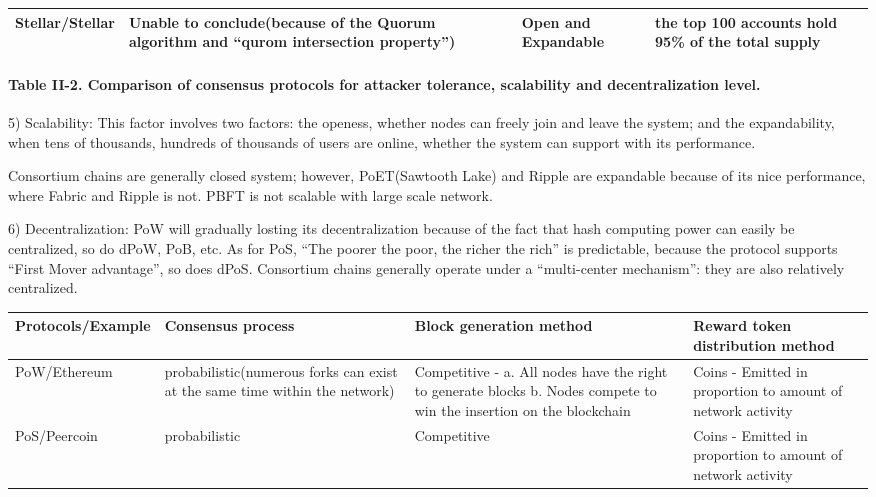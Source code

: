 \documentclass[doublespacing]{bmcart}
\begin{document}
\begin{CJK*}{UTF8}{gbsn}
\begin{tabular}{p{2cm}p{3cm}p{3cm}p{3cm}}
Stellar/Stellar 
& Unable to conclude(because of the Quorum algorithm and ``qurom intersection property'') 
& Open and Expandable 
& the top 100 accounts hold 95\% of the total supply \\ \hline
\end{tabular}
\paragraph{Table II-2. Comparison of consensus protocols for attacker tolerance, scalability and decentralization level.}


5) Scalability: This factor involves two factors: the openess, whether nodes can freely join and leave the system; and the expandability, when tens of thousands, hundreds of thousands of users are online, whether the system can support with its performance.

Consortium chains are generally closed system; however, PoET(Sawtooth Lake) and Ripple are expandable because of its nice performance, where Fabric and Ripple is not. PBFT is not scalable with large scale network.

6) Decentralization: PoW will gradually losting its decentralization because of the fact that hash computing power can easily be centralized, so do dPoW, PoB, etc. As for PoS, ``The poorer the poor, the richer the rich'' is predictable, because the protocol supports ``First Mover advantage'', so does dPoS. Consortium chains generally operate under a ``multi-center mechanism'': they are also relatively centralized.

\begin{tabular}{p{2cm}p{3cm}p{3cm}p{3cm}}
\hline
Protocols/E\-xample  & Consensus process & Block generation method & Reward token distribution method \\ \hline

PoW/Ethe\-reum  
& probabilistic(nume\-rous forks can exist at the same time within the network) 
& Competitive - \newline a. All nodes have the right to generate blocks \newline b. Nodes compete to win the insertion on the blockchain 
& Coins - Emitted in proportion to amount of network activity \\ \hline

PoS/Peercoin 
& probabilistic
& Competitive 
& Coins - Emitted in proportion to amount of network activity \\ \hline


\end{tabular}
\end{CJK*}
\end{document}
